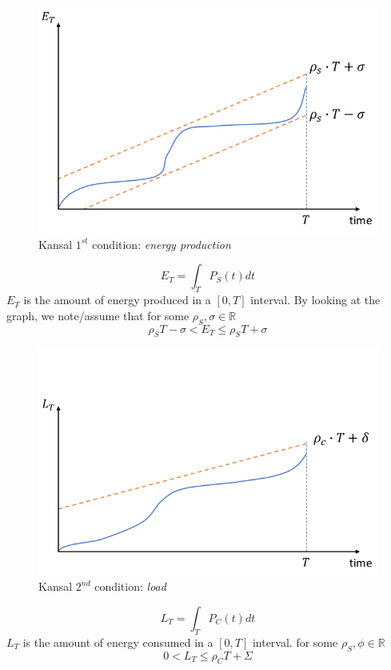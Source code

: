 \begin{paracol}{2}
   \begin{figure}[htbp]
      \centering
      \includegraphics{images/kansal_1.png}
      \caption{Kansal $1^{st}$ condition: \textit{energy production}}
      \label{fig:kansal_1}
   \end{figure}
   \switchcolumn
   \colfill
   \[E_T = \int_{T}P_S(t)dt\]
   $E_T$ is the amount of energy produced in a $[0,T]$ interval.
   By looking at the graph, we note/assume that for some $\rho_S,\sigma \in \mathbb{R}$
   \[\rho_S T - \sigma < E_T \leq \rho_S T + \sigma\] 
   \colfill
\end{paracol}

\begin{paracol}{2}
   \begin{figure}[htbp]
      \centering
      \includegraphics{images/kansal_2.png}
      \caption{Kansal $2^{nd}$ condition: \textit{load}}
      \label{fig:kansal_2}
   \end{figure}
   \switchcolumn
   \colfill
   \[L_T = \int_{T}P_C(t)dt\]
   $L_T$ is the amount of energy consumed in a $[0,T]$ interval.
   for some $\rho_S,\phi \in \mathbb{R}$
   \[0 < L_T \leq \rho_C T + \Sigma\] 
   \colfill
\end{paracol}

